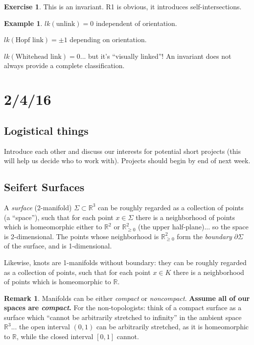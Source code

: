 \documentclass[11pt]{article}
\theoremstyle{plain}
\theoremstyle{definition}
\newtheorem{remark}{Remark}
\newtheorem{ex}{Example}
\newtheorem{exercise}{Exercise}
\begin{document}
\begin{exercise}
This is an invariant. R1 is obvious, it introduces self-intersections.
\end{exercise}

\begin{ex}
$lk(\text{unlink})=0$ independent of orientation.

$lk(\text{Hopf link})=\pm1$ depending on orientation.

$lk(\text{Whitehead link})=0$... but it's ``visually linked''! An invariant does not always provide a complete classification.
\end{ex}




\clearpage
\section{2/4/16}

\subsection{Logistical things}

Introduce each other and discuss our interests for potential short projects (this will help us decide who to work with).
Projects should begin by end of next week.


\subsection{Seifert Surfaces}

A \textit{surface} (2-manifold) $\Sigma\subset\mathbb{R}^3$ can be roughly regarded as a collection of points (a ``space''), such that for each point $x\in\Sigma$ there is a neighborhood of points which is homeomorphic either to $\mathbb{R}^2$ or $\mathbb{R}^2_{\ge 0}$ (the upper half-plane)... so the space is 2-dimensional. The points whose neighborhood is $\mathbb{R}^2_{\ge 0}$ form the \textit{boundary} $\partial\Sigma$ of the surface, and is 1-dimensional.

Likewise, knots are 1-manifolds without boundary: they can be roughly regarded as a collection of points, such that for each point $x\in K$ there is a neighborhood of points which is homeomorphic to $\mathbb{R}$.

\begin{remark}
Manifolds can be either \textit{compact} or \textit{noncompact}. \textbf{Assume all of our spaces are \textit{compact}.} For the non-topologists: think of a compact surface as a surface which ``cannot be arbitrarily stretched to infinity'' in the ambient space $\mathbb{R}^3$... the open interval $(0,1)$ can be arbitrarily stretched, as it is homeomorphic to $\mathbb{R}$, while the closed interval $[0,1]$ cannot.
\end{remark}
\end{document}
